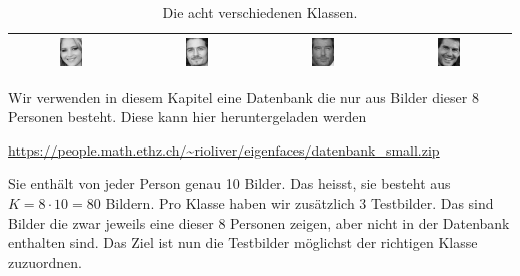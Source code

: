 \begin{table}[ht]
\begin{tabular}{|c|c|c|c|}
		\includegraphics[width=0.2\textwidth]{images/recognition/Jennifer_Lawrence} & \includegraphics[width=0.2\textwidth]{images/recognition/Orlando_Bloom} & \includegraphics[width=0.2\textwidth]{images/recognition/Pierce_Brosnan} & \includegraphics[width=0.2\textwidth]{images/recognition/Tom_Cruise} \\ \hline
	\end{tabular}
	\caption{Die acht verschiedenen Klassen. }
	\label{tab:classes}
\end{table}
Wir verwenden in diesem Kapitel eine Datenbank die nur aus Bilder dieser 8 Personen besteht.
Diese kann hier heruntergeladen werden
\begin{center}
	\url{https://people.math.ethz.ch/~rioliver/eigenfaces/datenbank_small.zip}
\end{center}
Sie enthält von jeder Person genau 10 Bilder.
Das heisst, sie besteht aus $K=8\cdot 10=80$ Bildern.
Pro Klasse haben wir zusätzlich 3 Testbilder.
Das sind Bilder die zwar jeweils eine dieser 8 Personen zeigen, aber nicht in der Datenbank enthalten sind.
Das Ziel ist nun die Testbilder möglichst der richtigen Klasse zuzuordnen.
